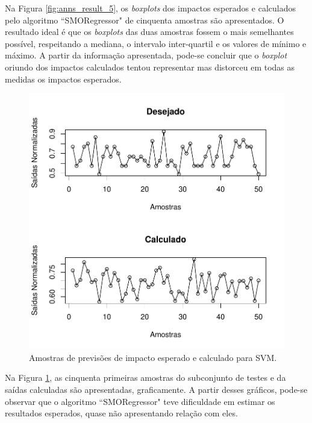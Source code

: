Na Figura \ref{fig:anns_result_5}, os \textit{boxplots} dos impactos esperados e calculados pelo algoritmo ``SMORegressor" de cinquenta amostras são apresentados. O resultado ideal é que os \textit{boxplots} das duas amostras fossem o mais semelhantes possível, respeitando a mediana, o intervalo inter-quartil e os valores de mínimo e máximo. A partir da informação apresentada, pode-se concluir que o \textit{boxplot} oriundo dos impactos calculados tentou representar mas distorceu em todas as medidas os impactos esperados.

\begin{figure}[!h]
  \vspace{-0.2cm}
  \centering
  \includegraphics[width=0.7\columnwidth]{image/smoreg_ex4_2.pdf}
  \caption{Amostras de previsões de impacto esperado e calculado para SVM.}
  \label{fig:anns_result_6}
\end{figure}

Na Figura \ref{fig:anns_result_6}, as cinquenta primeiras amostras do subconjunto de testes e da saídas calculadas são apresentadas, graficamente. A partir desses gráficos, pode-se observar que o algoritmo ``SMORegressor" teve dificuldade em estimar os resultados esperados, quase não apresentando relação com eles.

